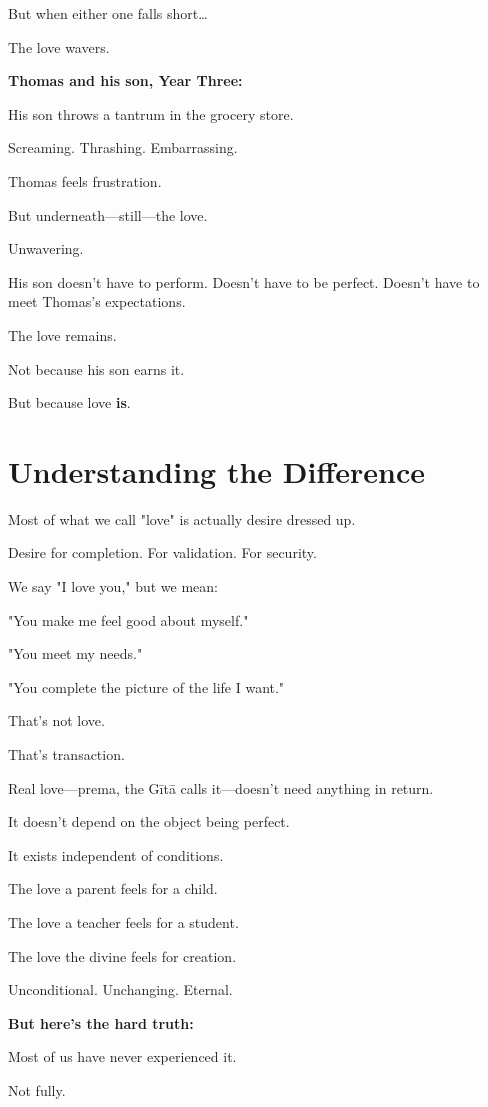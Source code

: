 \documentclass[11pt,twoside]{book}
\begin{document}
But when either one falls short\ldots{}

The love wavers.

\textbf{\textbf{Thomas and his son, Year Three:}}

His son throws a tantrum in the grocery store.

Screaming. Thrashing. Embarrassing.

Thomas feels frustration.

But underneath—still—the love.

Unwavering.

His son doesn't have to perform. Doesn't have to be perfect. Doesn't have to meet Thomas's expectations.

The love remains.

Not because his son earns it.

But because love \textbf{is}.

\section*{Understanding the Difference}

Most of what we call "love" is actually desire dressed up.

Desire for completion. For validation. For security.

We say "I love you," but we mean:

"You make me feel good about myself."

"You meet my needs."

"You complete the picture of the life I want."

That's not love.

That's transaction.

Real love—prema, the Gītā calls it—doesn't need anything in return.

It doesn't depend on the object being perfect.

It exists independent of conditions.

The love a parent feels for a child.

The love a teacher feels for a student.

The love the divine feels for creation.

Unconditional. Unchanging. Eternal.

\textbf{\textbf{But here's the hard truth:}}

Most of us have never experienced it.

Not fully.
\end{document}
